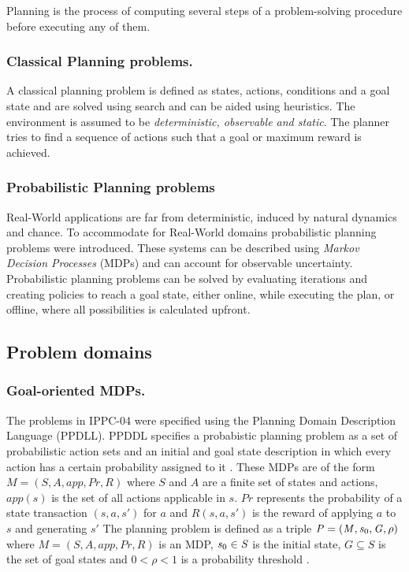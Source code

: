\documentclass[runningheads,a4paper]{llncs}
\begin{document}
Planning is the process of computing several steps of a problem-solving procedure before executing any of them.

\subsubsection{Classical Planning problems.}

A classical planning problem is defined as states, actions, conditions and a goal state and are solved using search and can be aided using heuristics. The environment is assumed to be \emph{deterministic, observable and static}. The planner tries to find a sequence of actions such that a goal or maximum reward is achieved.

\subsubsection{Probabilistic Planning problems}

Real-World applications are far from deterministic, induced by natural dynamics and chance. To accommodate for Real-World domains probabilistic planning problems were introduced.  These systems can be described using \emph{Markov Decision Processes} (MDPs) and can account for observable uncertainty. Probabilistic planning problems can be solved by evaluating iterations and creating policies to reach a goal state, either online, while executing the plan, or offline, where all possibilities is calculated upfront.

\subsection{Problem domains}

\subsubsection{Goal-oriented MDPs. }The problems in IPPC-04 were specified using the Planning Domain Description Language (PPDLL). PPDDL specifies a probabistic planning problem as a set of probabilistic action sets and an initial and goal state description in which every action has a certain probability assigned to it \cite{FFReplan}. These MDPs are of the form $\mathit{M = (S, A, app, Pr, R)}$ where $\mathit{S}$ and $\mathit{A}$ are a finite set of states and actions, $\mathit{app(s)}$ is the set of all actions applicable in $\mathit{s}$. $\mathit{Pr}$ represents the probability of a state transaction $\mathit{(s, a, s')}$ for $\mathit{a}$ and $\mathit{R(s, a, s')}$ is the reward of applying $\mathit{a}$ to $\mathit{s}$ and generating $\mathit{s'}$ The planning problem is defined as a triple $\mathit{P = (M, s\textsubscript{0}, G, \rho)}$ where $\mathit{M = (S, A, app, Pr, R)}$ is an MDP, $\mathit{s\textsubscript{0} \in S}$ is the initial state, $\mathit{G \subseteq S}$ is the set of goal states and $\mathit{0 < \rho < 1}$ is a probability threshold \cite{teichteil2010incremental}.
\end{document}
